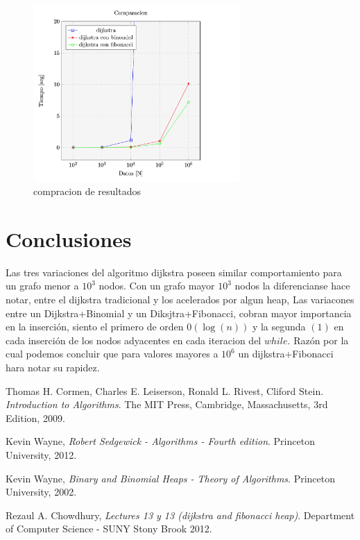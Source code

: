 \documentclass[a4paper,twocolumn,10pt]{article}
\begin{document}
\begin{figure}
 \caption{compracion de resultados}\label{Figure:comparacion}
    \includegraphics[width=0.7\textwidth]{graficos-3.jpg}
\end{figure}


\section{Conclusiones}
Las tres variaciones del algoritmo dijkstra poseen similar comportamiento para un grafo menor a $10^3$ nodos. Con un grafo 
mayor $10^3$ nodos la diferencianse hace notar, entre el dijkstra tradicional y los acelerados por algun heap,
Las variacones entre un Dijkstra+Binomial y un Diksjtra+Fibonacci, cobran mayor importancia en la inserción, siento el primero
de orden $0(\log(n))$ y la segunda $(1)$ en cada inserción de los nodos adyacentes en cada iteracion del $while$. Razón por 
la cual podemos concluir que para valores mayores a $10^6$ un dijkstra+Fibonacci hara notar su rapidez.


\begin{thebibliography}{9}
  Thomas H. Cormen, Charles E. Leiserson, Ronald L. Rivest, Cliford Stein.
  \emph{Introduction to Algorithms}.
  The MIT Press, Cambridge, Massachusetts,
  3rd Edition,
  2009.

  Kevin Wayne,
  \emph{Robert Sedgewick -  Algorithms - Fourth edition}.
  Princeton University,
  2012.
  
  Kevin Wayne,
  \emph{Binary and Binomial Heaps - Theory of Algorithms}.
  Princeton University,
  2002.

  Rezaul A. Chowdhury,
  \emph{Lectures 13 y 13 (dijkstra and fibonacci heap)}.
  Department of Computer Science - SUNY Stony Brook
  2012.

\end{thebibliography}
\end{document}
